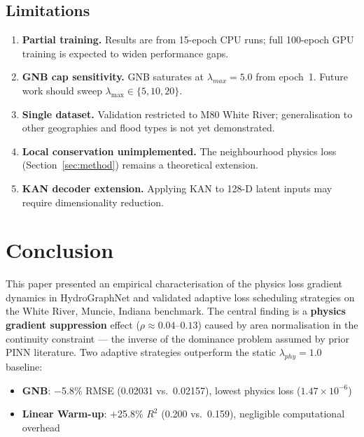 \documentclass[conference]{IEEEtran}
\begin{document}
\subsection{Limitations}
\begin{enumerate}
  \item \textbf{Partial training.} Results are from 15-epoch CPU runs;
        full 100-epoch GPU training is expected to widen performance gaps.
  \item \textbf{GNB cap sensitivity.} GNB saturates at $\lambda_{max}=5.0$
        from epoch~1. Future work should sweep $\lambda_{\max}\in\{5,10,20\}$.
  \item \textbf{Single dataset.} Validation restricted to M80 White River;
        generalisation to other geographies and flood types is not yet
        demonstrated.
  \item \textbf{Local conservation unimplemented.} The neighbourhood
        physics loss (Section~\ref{sec:method}) remains a theoretical
        extension.
  \item \textbf{KAN decoder extension.} Applying KAN to 128-D latent
        inputs may require dimensionality reduction.
\end{enumerate}

\section{Conclusion}
\label{sec:conclusion}

This paper presented an empirical characterisation of the physics loss
gradient dynamics in HydroGraphNet and validated adaptive loss scheduling
strategies on the White River, Muncie, Indiana benchmark. The central
finding is a \textbf{physics gradient suppression} effect ($\rho\approx
0.04$--$0.13$) caused by area normalisation in the continuity constraint
--- the inverse of the dominance problem assumed by prior PINN literature.
Two adaptive strategies outperform the static $\lambda_{phy}=1.0$ baseline:

\begin{itemize}
  \item \textbf{GNB}: $-$5.8\% RMSE (0.02031 vs.\ 0.02157), lowest physics
        loss ($1.47\times10^{-6}$)
  \item \textbf{Linear Warm-up}: $+$25.8\% $R^2$ (0.200 vs.\ 0.159),
        negligible computational overhead
\end{itemize}
\end{document}
